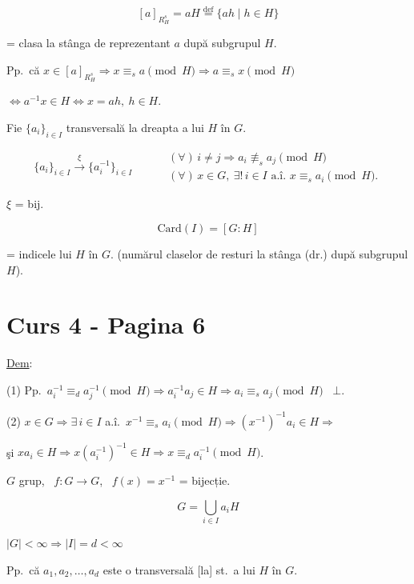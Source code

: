 \[
[a]_{R_H^s} = aH \overset{\text{def}}{=} \{ah \mid h\in H\}
\]

\noindent = clasa la stânga de reprezentant $a$ după subgrupul $H$.

\bigskip
\noindent Pp.\ că $x\in[a]_{R_H^s} \Rightarrow x\equiv_s a \pmod H \Rightarrow a\equiv_s x \pmod H$

\noindent $\Leftrightarrow a^{-1}x\in H \Leftrightarrow x=ah,\ h\in H$.

\bigskip
\noindent Fie $\{a_i\}_{i\in I}$ transversală la dreapta a lui $H$ în $G$.

\[
\{a_i\}_{i\in I} \xrightarrow{\ \xi\ } \{a_i^{-1}\}_{i\in I} \qquad
\begin{aligned}
&(\forall)\, i\neq j \Rightarrow a_i \not\equiv_s a_j \pmod H\\
&(\forall)\, x\in G,\ \exists!\, i\in I \text{ a.î. } x\equiv_s a_i \pmod H.
\end{aligned}
\]

\noindent $\xi$ = bij.

\[
\text{Card}(I) = [G:H]
\]

\noindent = indicele lui $H$ în $G$. (numărul claselor de resturi la stânga (dr.) după subgrupul $H$).






\section*{Curs 4 - Pagina 6}

\noindent\underline{Dem}:

\bigskip
\noindent (1) Pp.\ $a_i^{-1}\equiv_d a_j^{-1} \pmod H \Rightarrow a_i^{-1}a_j\in H \Rightarrow a_i\equiv_s a_j \pmod H$ \ $\bot$.

\bigskip
\noindent (2) $x\in G \Rightarrow \exists\, i\in I$ a.î.\ $x^{-1}\equiv_s a_i \pmod H \Rightarrow (x^{-1})^{-1}a_i\in H \Rightarrow$

\noindent şi $xa_i\in H \Rightarrow x(a_i^{-1})^{-1}\in H \Rightarrow x\equiv_d a_i^{-1} \pmod H$.

\bigskip
\noindent $G$ grup, \ $f:G\to G$, \ $f(x)=x^{-1}$ = bijecție.

\bigskip
\noindent
\[
G = \bigcup_{i\in I} a_iH
\]

\noindent $|G|<\infty \Rightarrow |I|=d<\infty$

\medskip
\noindent Pp.\ că $a_1,a_2,\ldots,a_d$ este o transversală [la] st.\ a lui $H$ în $G$.

